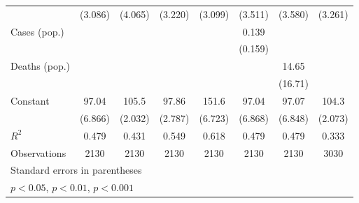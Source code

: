 \documentclass{article}
\begin{document}
{\begin{longtable}{l*{7}{c}}
                &  (3.086)         &  (4.065)         &  (3.220)         &  (3.099)         &  (3.511)         &  (3.580)         &  (3.261)         \\
Cases (pop.)    &                  &                  &                  &                  &    0.139         &                  &                  \\
                &                  &                  &                  &                  &  (0.159)         &                  &                  \\
Deaths (pop.)   &                  &                  &                  &                  &                  &    14.65         &                  \\
                &                  &                  &                  &                  &                  &  (16.71)         &                  \\
Constant        &    97.04\sym{***}&    105.5\sym{***}&    97.86\sym{***}&    151.6\sym{***}&    97.04\sym{***}&    97.07\sym{***}&    104.3\sym{***}\\
                &  (6.866)         &  (2.032)         &  (2.787)         &  (6.723)         &  (6.868)         &  (6.848)         &  (2.073)         \\
\hline
\(R^{2}\)       &    0.479         &    0.431         &    0.549         &    0.618         &    0.479         &    0.479         &    0.333         \\
Observations    &     2130         &     2130         &     2130         &     2130         &     2130         &     2130         &     3030         \\
\hline\hline
\multicolumn{8}{l}{\footnotesize Standard errors in parentheses}\\
\multicolumn{8}{l}{\footnotesize \sym{*} \(p<0.05\), \sym{**} \(p<0.01\), \sym{***} \(p<0.001\)}\\
\end{longtable}
}
\end{document}
